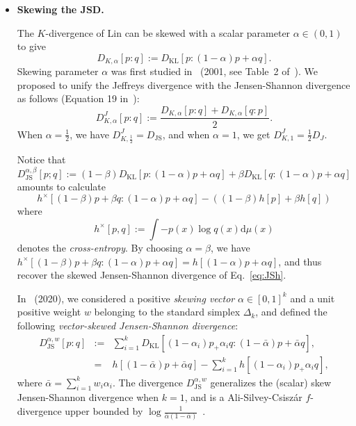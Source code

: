 \documentclass[11pt]{article}
\def\dmu{\mathrm{d}\mu}
\def\KL{\mathrm{KL}}
\def\dmu{\mathrm{d}\mu}
\def\KL{\mathrm{KL}}
\def\JS{\mathrm{JS}}
\begin{document}
\begin{itemize}

	\item {\bf Skewing the JSD.} 
	
	The $K$-divergence of Lin can be skewed with a scalar parameter $\alpha\in(0,1)$ to give
	\begin{equation}\label{eq:divK}
	D_{K,\alpha}[p:q]:=D_\KL\left[p:(1-\alpha)p+\alpha q\right].
	\end{equation}
	Skewing parameter $\alpha$ was first studied in~\cite{skewJS-2001} (2001, see Table~2 of~\cite{skewJS-2001}).
	We proposed to unify the Jeffreys divergence with the Jensen-Shannon divergence as follows (Equation 19 in~\cite{nielsen2010family}):
	\begin{equation}\label{eq:JJSalpha}
	D_{K,\alpha}^J[p:q]:=\frac{D_{K,\alpha}[p:q]+D_{K,\alpha}[q:p]}{2}.
	\end{equation}
	When $\alpha=\frac{1}{2}$, we have $D_{K,\frac{1}{2}}^J=D_\JS$, and when $\alpha=1$, we get $D_{K,1}^J=\frac{1}{2}D_J$.
	
	Notice that 
	$$
	D_\JS^{\alpha,\beta}[p;q]:=(1-\beta)D_\KL[p:(1-\alpha)p+\alpha q]+\beta D_\KL[q:(1-\alpha)p+\alpha q]
	$$ 
	amounts to calculate
	 $$
	h^\times[(1-\beta)p+\beta q:(1-\alpha)p+\alpha q]-((1-\beta)h[p]+\beta h[q])
	$$ 
	where 
	$$
	h^\times[p,q]:=\int -p(x)\log q(x)\dmu(x)
	$$ 
	denotes the {\em cross-entropy}. By choosing $\alpha=\beta$, we have $h^\times[(1-\beta)p+\beta q:(1-\alpha)p+\alpha q]=h[(1-\alpha)p+\alpha q]$, 
	and thus recover the skewed Jensen-Shannon divergence of Eq.~\ref{eq:JSh}.
	
	
	In~\cite{nielsen2020generalization} (2020), we considered a positive {\em skewing vector} $\alpha\in [0,1]^k$  and a unit positive weight $w$ belonging to the standard simplex $\Delta_k$, and defined the following {\em vector-skewed Jensen-Shannon divergence}:
\begin{eqnarray}
	D_\JS^{\alpha,w}[p:q] &:=& \sum_{i=1}^k D_\KL[(1-\alpha_i)p_+\alpha_i q : (1-\bar\alpha)p+\bar\alpha q],\\
	&=& h[(1-\bar\alpha)p+\bar\alpha q]-\sum_{i=1}^k h[(1-\alpha_i)p_+\alpha_i q],
\end{eqnarray}
	where $\bar\alpha=\sum_{i=1}^k w_i\alpha_i$. 
	The divergence $D_\JS^{\alpha,w}$ generalizes the (scalar) skew Jensen-Shannon divergence when $k=1$, and is a Ali-Silvey-Csisz\'ar $f$-divergence upper bounded by $\log \frac{1}{\bar\alpha(1-\bar\alpha)}$~\cite{nielsen2020generalization}.
	

\end{itemize}
\end{document}
